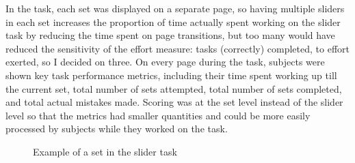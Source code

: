 \documentclass[
  12,
  letterpaper,
  DIV=11,
  numbers=noendperiod]{scrartcl}
\begin{document}
In the task, each set was displayed on a separate page, so having
multiple sliders in each set increases the proportion of time actually
spent working on the slider task by reducing the time spent on page
transitions, but too many would have reduced the sensitivity of the
effort measure: tasks (correctly) completed, to effort exerted, so I
decided on three. On every page during the task, subjects were shown key
task performance metrics, including their time spent working up till the
current set, total number of sets attempted, total number of sets
completed, and total actual mistakes made. Scoring was at the set level
instead of the slider level so that the metrics had smaller quantities
and could be more easily processed by subjects while they worked on the
task.

\begin{figure}


\caption{\label{fig-slider-set-example}Example of a set in the slider
task}

\end{figure}%
\end{document}
